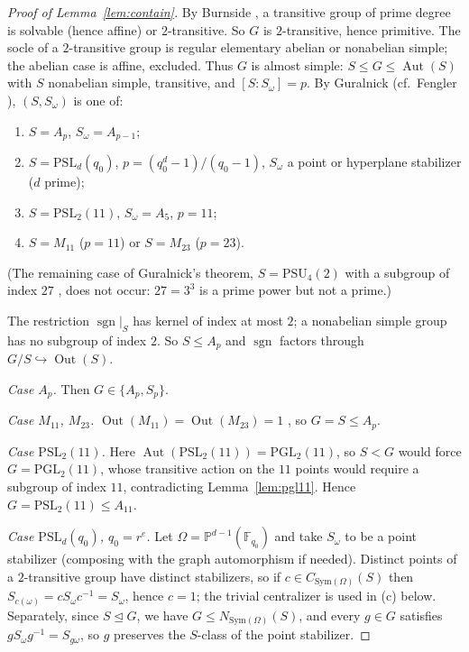 \documentclass[11pt,a4paper]{amsart}
\newcommand{\PSL}{\mathrm{PSL}}
\newcommand{\PGL}{\mathrm{PGL}}
\newcommand{\F}{\mathbb{F}}
\newcommand{\sgn}{\operatorname{sgn}}
\newcommand{\Out}{\operatorname{Out}}
\newcommand{\Aut}{\operatorname{Aut}}
\theoremstyle{plain}
\theoremstyle{definition}
\begin{document}
\begin{proof}[Proof of Lemma~\ref{lem:contain}]
By Burnside \cite[\S251]{Burnside}, a transitive group of prime degree is solvable (hence affine) or \(2\)-transitive. So \(G\) is \(2\)-transitive, hence primitive. The socle of a \(2\)-transitive group is regular elementary abelian or nonabelian simple; the abelian case is affine, excluded. Thus \(G\) is almost simple: \(S\le G\le\Aut(S)\) with \(S\) nonabelian simple, transitive, and \([S:S_\omega]=p\). By Guralnick \cite{Guralnick1983} (cf.\ Fengler \cite[Cor.~2.39]{Fengler}), \((S,S_\omega)\) is one of:
\begin{enumerate}
\item \(S=A_p\), \(S_\omega=A_{p-1}\);
\item \(S=\PSL_d(q_0)\), \(p=(q_0^d-1)/(q_0-1)\), \(S_\omega\) a point or hyperplane stabilizer (\(d\) prime);
\item \(S=\PSL_2(11)\), \(S_\omega=A_5\), \(p=11\);
\item \(S=M_{11}\) (\(p=11\)) or \(S=M_{23}\) (\(p=23\)).
\end{enumerate}
(The remaining case of Guralnick's theorem, \(S=\mathrm{PSU}_4(2)\) with a subgroup of index \(27\) \cite[Thm.~2.38]{Fengler}, does not occur: \(27=3^3\) is a prime power but not a prime.)

The restriction \(\sgn|_S\) has kernel of index at most \(2\); a nonabelian simple group has no subgroup of index \(2\). So \(S\le A_p\) and \(\sgn\) factors through \(G/S\hookrightarrow\Out(S)\).

\textit{Case \(A_p\).} Then \(G\in\{A_p,S_p\}\).

\textit{Case \(M_{11}\), \(M_{23}\).} \(\Out(M_{11})=\Out(M_{23})=1\) \cite{WilsonFSG}, so \(G=S\le A_p\).

\textit{Case \(\PSL_2(11)\).} Here \(\Aut(\PSL_2(11))=\PGL_2(11)\), so \(S<G\) would force \(G=\PGL_2(11)\), whose transitive action on the \(11\) points would require a subgroup of index \(11\), contradicting Lemma~\ref{lem:pgl11}. Hence \(G=\PSL_2(11)\le A_{11}\).

\textit{Case \(\PSL_d(q_0)\), \(q_0=r^e\).} Let \(\Omega=\mathbb P^{d-1}(\F_{q_0})\) and take \(S_\omega\) to be a point stabilizer (composing with the graph automorphism if needed). Distinct points of a \(2\)-transitive group have distinct stabilizers, so if \(c\in C_{\mathrm{Sym}(\Omega)}(S)\) then \(S_{c(\omega)}=cS_\omega c^{-1}=S_\omega\), hence \(c=1\); the trivial centralizer is used in (c) below. Separately, since \(S\trianglelefteq G\), we have \(G\le N_{\mathrm{Sym}(\Omega)}(S)\), and every \(g\in G\) satisfies \(gS_\omega g^{-1}=S_{g\omega}\), so \(g\) preserves the \(S\)-class of the point stabilizer.


\end{proof}
\end{document}
